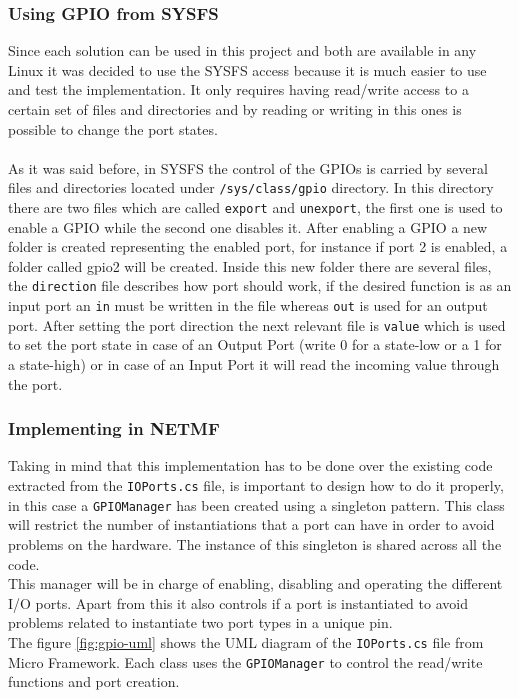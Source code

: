 \subsubsection{Using GPIO from SYSFS}\label{SSS:IOSharp-GPIO-SYSFS}
Since each solution can be used in this project and both are available in any Linux it was decided to use the SYSFS access because it is much easier to use and test the implementation. It only requires having read/write access to a certain set of files and directories and by reading or writing in this ones is possible to change the port states.
\\
\\
As it was said before, in SYSFS the control of the GPIOs is carried by several files and directories located under \verb!/sys/class/gpio! directory. In this directory there are two files which are called \verb!export! and \verb!unexport!, the first one is used to enable a GPIO while the second one disables it. After enabling a GPIO a new folder is created representing the enabled port, for instance if port 2 is enabled, a folder called gpio2 will be created. Inside this new folder there are several files, the \verb!direction! file describes how port should work, if the desired function is as an input port an \verb!in! must be written in the file whereas \verb!out! is used for an output port. After setting the port direction the next relevant file is \verb!value! which is used to set the port state in case of an Output Port (write 0 for a state-low or a 1 for a state-high) or in case of an Input Port it will read the incoming value through the port.

\subsubsection{Implementing in NETMF}\label{SSS:Implementing-GPIO-NETMF}
Taking in mind that this implementation has to be done over the existing code extracted from the \verb!IOPorts.cs! file, is important to design how to do it properly, in this case a \verb!GPIOManager! has been created using a singleton pattern. This class will restrict the number of instantiations that a port can have in order to avoid problems on the hardware. The instance of this singleton is shared across all the code.
\\
This manager will be in charge of enabling, disabling and operating the different I/O ports. Apart from this it also controls if a port is instantiated to avoid problems related to instantiate two port types in a unique pin.
\\
The figure \ref{fig:gpio-uml} shows the UML diagram of the \verb!IOPorts.cs! file from Micro Framework. Each class uses the \verb!GPIOManager! to control the read/write functions and port creation.

